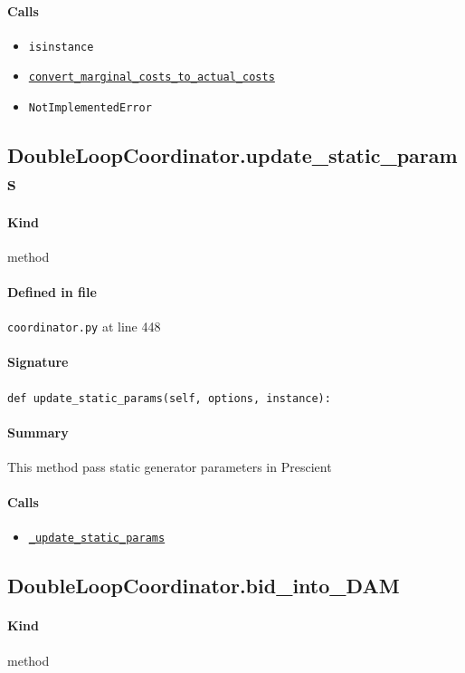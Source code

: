 \documentclass[11pt]{report}
\begin{document}
\paragraph{Calls}
\begin{itemize}[leftmargin=*]
  \item \texttt{isinstance}
  \item \hyperref[def:utils.py:convert_marginal_costs_to_actual_costs:L15]{\texttt{convert\_marginal\_costs\_to\_actual\_costs}}
  \item \texttt{NotImplementedError}
\end{itemize}
\subsection{DoubleLoopCoordinator.update\_static\_params}
\label{def:coordinator.py:DoubleLoopCoordinator.update_static_params:L448}
\paragraph{Kind} method
\paragraph{Defined in file} \texttt{coordinator.py} at line 448
\paragraph{Signature} \texttt{def update\_static\_params(self, options, instance):}
\paragraph{Summary} This method pass static generator parameters in Prescient
\paragraph{Calls}
\begin{itemize}[leftmargin=*]
  \item \hyperref[def:coordinator.py:DoubleLoopCoordinator._update_static_params:L399]{\texttt{\_update\_static\_params}}
\end{itemize}
\subsection{DoubleLoopCoordinator.bid\_into\_DAM}
\label{def:coordinator.py:DoubleLoopCoordinator.bid_into_DAM:L468}
\paragraph{Kind} method
\end{document}
